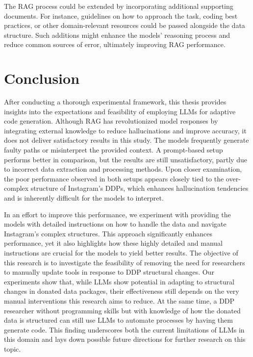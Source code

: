 \documentclass{DESSThesis}
\begin{document}
The RAG process could be extended by incorporating additional supporting documents. For instance, guidelines on how to approach the task, coding best practices, or other domain-relevant resources could be passed alongside the data structure. Such additions might enhance the models' reasoning process and reduce common sources of error, ultimately improving RAG performance.

\chapter{Conclusion} \label{chap:conclusion}

After conducting a thorough experimental framework, this thesis provides insights into the expectations and feasibility of employing LLMs for adaptive code generation. Although RAG has revolutionized model responses by integrating external knowledge to reduce hallucinations and improve accuracy, it does not deliver satisfactory results in this study. The models frequently generate faulty paths or misinterpret the provided context. A prompt-based setup performs better in comparison, but the results are still unsatisfactory, partly due to incorrect data extraction and processing methods. Upon closer examination, the poor performance observed in both setups appears closely tied to the over-complex structure of Instagram's DDPs, which enhances hallucination tendencies and is inherently difficult for the models to interpret.

In an effort to improve this performance, we experiment with providing the models with detailed instructions on how to handle the data and navigate Instagram's complex structures. This approach significantly enhances performance, yet it also highlights how these highly detailed and manual instructions are crucial for the models to yield better results. The objective of this research is to investigate the feasibility of removing the need for researchers to manually update tools in response to DDP structural changes. Our experiments show that, while LLMs show potential in adapting to structural changes in donated data packages, their effectiveness still depends on the very manual interventions this research aims to reduce. At the same time, a DDP researcher without programming skills but with knowledge of how the donated data is structured can still use LLMs to automate processes by having them generate code. This finding underscores both the current limitations of LLMs in this domain and lays down possible future directions for further research on this topic. 
\end{document}
